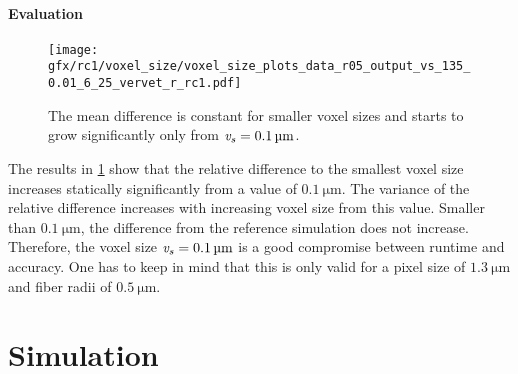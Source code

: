 \paragraph{Evaluation}
%
\begin{figure}[!t]
\centering
\texttt{[image: gfx/rc1/voxel\_size/voxel\_size\_plots\_data\_r05\_output\_vs\_135\_0.01\_6\_25\_vervet\_r\_rc1.pdf]}
\caption{The mean difference is constant for smaller voxel sizes and starts to grow significantly only from $\textnormal{$\mathit{v_{s}}$}=\SI{0.1}{\micro\meter}$.}
\label{fig:voxelsizeNoise}
\end{figure}
% 
The results in \cref{fig:voxelsizeNoise} show that the relative difference to the smallest voxel size increases statically significantly from a value of $\SI{0.1}{\micro\meter}$.
The variance of the relative difference increases with increasing voxel size from this value.
Smaller than $\SI{0.1}{\micro\meter}$, the difference from the reference simulation does not increase.
Therefore, the voxel size $\textnormal{$\mathit{v_{s}}$} = \SI{0.1}{\micro\meter}$ is a good compromise between runtime and accuracy.
One has to keep in mind that this is only valid for a pixel size of $\SI{1.3}{\micro\meter}$ and fiber radii of $\SI{0.5}{\micro\meter}$.
% 
%
%
\section{Simulation}
%
